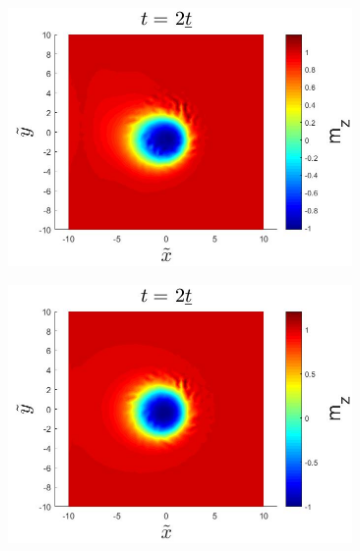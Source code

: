 \begin{figure}[h!]
\centering
\begin{subfigure}{.45\textwidth}
  \centering
  \includegraphics[width=\linewidth]{Figures/SkyrmionExA001.jpg}
  \caption{}
\end{subfigure}
\begin{subfigure}{.45\textwidth}
  \centering
  \includegraphics[width=\linewidth]{Figures/SkyrmionExA07.jpg}
  \caption{}
\end{subfigure}


\end{figure}
